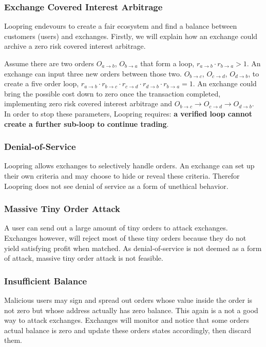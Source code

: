 \documentclass[UTF8,nofonts]{article}
\begin{document}
\subsubsection{Exchange Covered Interest Arbitrage}

Loopring endevours to create a fair ecosystem and find a balance between customers (users) and exchanges. Firstly, we will explain how an exchange could archive a zero risk covered interest arbitrage.

Assume there are two orders $O_{a\rightarrow b}$, $O_{b\rightarrow a}$ that form a loop, $r_{a\rightarrow b} \cdot r_{b\rightarrow a} > 1$. An exchange can input three new orders between those two. $O_{b\rightarrow c}$, $O_{c\rightarrow d}$, $O_{d\rightarrow b}$, to create a five order loop,  $r_{a\rightarrow b} \cdot r_{b\rightarrow c} \cdot r_{c\rightarrow d}\cdot r_{d\rightarrow b}\cdot r_{b\rightarrow a} = 1$. An exchange could bring the possible cost down to zero once the transaction completed, implementing zero risk covered interest arbitrage
and $O_{b\rightarrow c}\rightarrow O_{c\rightarrow d}\rightarrow O_{d\rightarrow b}$. In order to stop these parameters, Loopring requires: {\bfseries a verified loop cannot create a further sub-loop to continue trading}.

\subsubsection{Denial-of-Service}

Loopring allows exchanges to selectively handle orders. An exchange can set up their own criteria and may choose to hide or reveal these criteria. Therefor Loopring does not see denial of service as a form of unethical behavior.

\subsubsection{Massive Tiny Order Attack}
A user can send out a large amount of tiny orders to attack exchanges. Exchanges however, will reject most of these tiny orders because they do not yield satisfying profit when matched. As denial-of-service is not deemed as a form of attack, massive tiny order attack is not feasible.

\subsubsection{Insufficient Balance}

Malicious users may sign and spread out orders whose value inside the order is not zero but whose address actually has zero balance. This again is a not a good way to attack exchanges. Exchanges will monitor and notice that some orders actual balance is zero and update these orders states accordingly, then discard them.  
\end{document}
